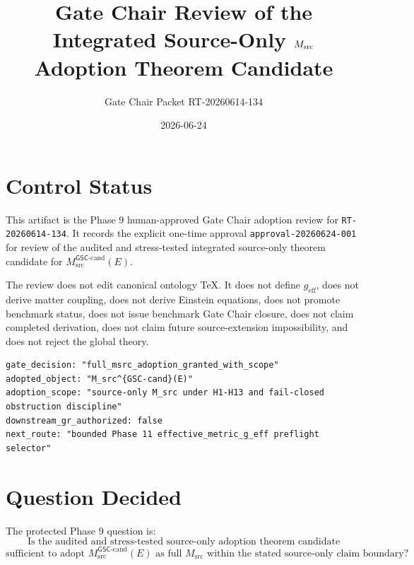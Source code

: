 \documentclass[11pt]{article}
\title{Gate Chair Review of the Integrated Source-Only \(\Msrc\) Adoption Theorem Candidate}
\author{Gate Chair Packet RT-20260614-134}
\date{2026-06-24}
\newcommand{\Msrc}{M_{\mathrm{src}}}
\newcommand{\Mgsccand}{M_{\mathrm{src}}^{\mathsf{GSC}\mbox{-}\mathrm{cand}}}
\newcommand{\geff}{g_{\mathrm{eff}}}
\begin{document}
\maketitle

\section{Control Status}

This artifact is the Phase 9 human-approved Gate Chair adoption review for
\texttt{RT-20260614-134}. It records the explicit one-time approval
\texttt{approval-20260624-001} for review of the audited and stress-tested
integrated source-only theorem candidate for \(\Mgsccand(E)\).

The review does not edit canonical ontology TeX. It does not define
\(\geff\), does not derive matter coupling, does not derive Einstein
equations, does not promote benchmark status, does not issue benchmark Gate
Chair closure, does not claim completed derivation, does not claim future
source-extension impossibility, and does not reject the global theory.

\begin{verbatim}
gate_decision: "full_msrc_adoption_granted_with_scope"
adopted_object: "M_src^{GSC-cand}(E)"
adoption_scope: "source-only M_src under H1-H13 and fail-closed obstruction discipline"
downstream_gr_authorized: false
next_route: "bounded Phase 11 effective_metric_g_eff preflight selector"
\end{verbatim}

\section{Question Decided}

The protected Phase 9 question is:
\[
\text{Is the audited and stress-tested source-only adoption theorem candidate}
\]
\[
\text{sufficient to adopt }\Mgsccand(E)\text{ as full }\Msrc
\text{ within the stated source-only claim boundary?}
\]
\end{document}
